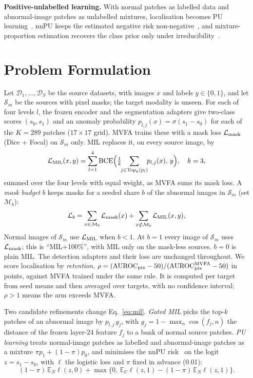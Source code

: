 \documentclass[10pt,twocolumn,letterpaper]{article}
\begin{document}
\textbf{Positive-unlabelled learning.} With normal patches as labelled data and abnormal-image patches as unlabelled mixtures, localisation becomes PU learning~\cite{elkan2008pu}. nnPU keeps the estimated negative risk non-negative~\cite{kiryo2017nnpu}, and mixture-proportion estimation recovers the class prior only under irreducibility~\cite{ramaswamy2016mpe}.

\section{Problem Formulation}
\label{sec:problem}
Let $\mathcal{D}_1,\dots,\mathcal{D}_S$ be the source datasets, with images $x$ and labels $y\in\{0,1\}$, and let $\mathcal{S}_m$ be the sources with pixel masks; the target modality is unseen. For each of four levels $l$, the frozen encoder and the segmentation adapters give two-class scores $(s_0,s_1)$ and an anomaly probability $p_{l,j}(x)=\sigma(s_1-s_0)$ for each of the $K=289$ patches ($17\times17$ grid). MVFA trains these with a mask loss $\mathcal{L}_{\rm mask}$ (Dice + Focal) on $\mathcal{S}_m$ only. MIL replaces it, on every source image, by
\begin{equation}
\mathcal{L}_{\rm MIL}(x,y)=\sum_{l=1}^{4}\mathrm{BCE}\Big(\tfrac{1}{k}\!\!\sum_{j\in\mathrm{Top}_k(p_l)}\!\! p_{l,j}(x),\,y\Big),\quad k=3,
\label{eq:mil}
\end{equation}
summed over the four levels with equal weight, as MVFA sums its mask loss. A \emph{mask budget} $b$ keeps masks for a seeded share $b$ of the abnormal images in $\mathcal{S}_m$ (set $\mathcal{M}_b$):
\begin{equation}
\mathcal{L}_b=\sum_{x\in\mathcal{M}_b}\mathcal{L}_{\rm mask}(x)+\sum_{x\notin\mathcal{M}_b}\mathcal{L}_{\rm MIL}(x,y),
\label{eq:budget}
\end{equation}
Normal images of $\mathcal{S}_m$ use $\mathcal{L}_{\rm MIL}$ when $b<1$. At $b=1$ every image of $\mathcal{S}_m$ uses $\mathcal{L}_{\rm mask}$; this is ``MIL+100\%'', with MIL only on the mask-less sources. $b=0$ is plain MIL. The detection adapters and their loss are unchanged throughout. We score localisation by \emph{retention}, $\rho=(\mathrm{AUROC}_{\rm pix}-50)/(\mathrm{AUROC}^{\rm MVFA}_{\rm pix}-50)$ in points, against MVFA trained under the same rule. It is computed per target from seed means and then averaged over targets, with no confidence interval; $\rho>1$ means the arm exceeds MVFA.

Two candidate refinements change Eq.~\eqref{eq:mil}. \emph{Gated MIL} picks the top-$k$ patches of an abnormal image by $p_{l,j}\,g_j$, with $g_j=1-\max_{n}\cos(f_j,n)$ the distance of the frozen layer-24 feature $f_j$ to a bank of normal source patches. \emph{PU learning} treats normal-image patches as labelled and abnormal-image patches as a mixture $\pi p_1+(1-\pi)p_0$, and minimises the nnPU risk~\cite{kiryo2017nnpu} on the logit $z=s_1-s_0$, with $\ell$ the logistic loss and $\pi$ fixed in advance (0.01):
\begin{equation}
(1-\pi)\,\mathbb{E}_N\ell(z,0)+\max\{0,\ \mathbb{E}_U\ell(z,1)-(1-\pi)\,\mathbb{E}_N\ell(z,1)\}.
\label{eq:nnpu}
\end{equation}
\end{document}
